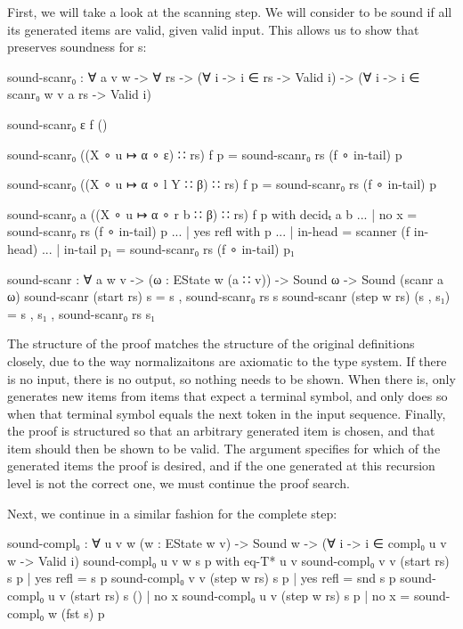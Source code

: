		First, we will take a look at the scanning step. We will consider
		 to be sound if all its generated items are valid, given
		valid input. This allows us to show that  preserves
		soundness for s:

		\begin{code}
			  sound-scanr₀ : ∀ {a v w} -> ∀ rs ->
			    (∀ {i} -> i ∈ rs -> Valid i) ->
			    (∀ {i} -> i ∈ scanr₀ {w} {v} a rs -> Valid i)
			
			  sound-scanr₀ ε f ()
			  
			  sound-scanr₀ ((X ∘ u ↦ α ∘ ε) ∷ rs) f p = 
			    sound-scanr₀ rs (f ∘ in-tail) p
			
			  sound-scanr₀ ((X ∘ u ↦ α ∘ l Y ∷ β) ∷ rs) f p = 
			    sound-scanr₀ rs (f ∘ in-tail) p
			
			  sound-scanr₀ {a} ((X ∘ u ↦ α ∘ r b ∷ β) ∷ rs) f p with decidₜ a b
			  ... | no x = sound-scanr₀ rs (f ∘ in-tail) p
			  ... | yes refl with p
			  ...            | in-head    = scanner (f in-head)
			  ...            | in-tail p₁ = sound-scanr₀ rs (f ∘ in-tail) p₁
			
			  sound-scanr : ∀ {a w v} -> (ω : EState w (a ∷ v)) ->
			    Sound ω -> Sound (scanr a ω)
			  sound-scanr (start rs) s = s , sound-scanr₀ rs s
			  sound-scanr (step w rs) (s , s₁) = s , s₁ , sound-scanr₀ rs s₁
		\end{code}

		The structure of the proof matches the structure of the original
		definitions closely, due to the way normalizaitons are axiomatic to the
		type system. If there is no input, there is no output, so nothing needs
		to be shown. When there is,  only generates new items
		from items that expect a terminal symbol, and only does so when that
		terminal symbol equals the next token in the input sequence. Finally,
		the proof is structured so that an arbitrary generated item is chosen,
		and that item should then be shown to be valid. The argument 
		specifies for which of the generated items the proof is desired, and if
		the one generated at this recursion level is not the correct one, we
		must continue the proof search.

		Next, we continue in a similar fashion for the complete step:

		\begin{code}
			  sound-compl₀ : ∀ {u v w} (w : EState w v) ->
			    Sound w -> (∀ {i} -> i ∈ compl₀ {u} {v} w -> Valid i)
			  sound-compl₀ {u} {v} w s p           with eq-T* u v
			  sound-compl₀ {v} {v} (start rs) s p  | yes refl = s p
			  sound-compl₀ {v} {v} (step w rs) s p | yes refl = snd s p
			  sound-compl₀ {u} {v} (start rs) s () | no x
			  sound-compl₀ {u} {v} (step w rs) s p | no x = sound-compl₀ w (fst s) p
		\end{code}

